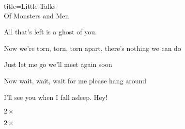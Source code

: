\begin{song}{title=\predtitle\centering Little Talks \\\large Of Monsters and Men  \vspace*{-0.3cm}}
\begin{centerjustified}
    All that's left is a ghost of you.
    
    Now we're torn, torn, torn apart, there's nothing we can do
    
    Just let me go we'll meet again soon
    
    Now wait, wait, wait for me please hang around
    
    I'll see you when I fall asleep. Hey!

 $2 \times$

 $2 \times$




\end{centerjustified}
\setcounter{Slokočet}{0}
\end{song}
